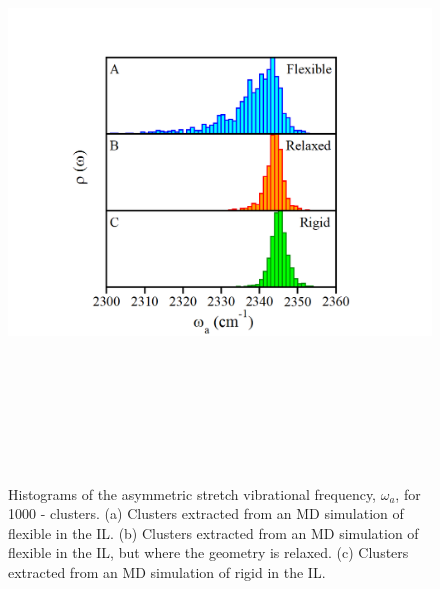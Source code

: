 \documentclass[]{article}
\begin{document}
\begin{figure}
  \centering
  \includegraphics[width=6.43125in,height=6.41597in]{figure5.png}
  \caption{Histograms of the  asymmetric stretch vibrational frequency, \(\omega_{a}\), for 1000 -\ce{[C4C1im][PF6]} clusters. (a) Clusters extracted from an MD simulation of flexible  in the \ce{[C4C1im][PF6]} IL. (b) Clusters extracted from an MD simulation of flexible  in the \ce{[C4C1im][PF6]} IL, but where the  geometry is relaxed. (c) Clusters extracted from an MD simulation of rigid  in the \ce{[C4C1im][PF6]} IL.}
  \label{paper_03:fig5}
\end{figure}
\end{document}
